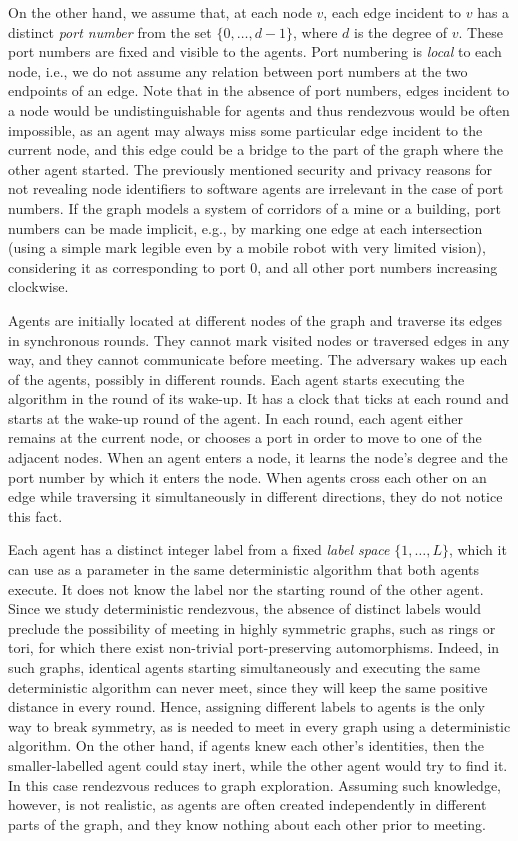 \documentclass{llncs}
\begin{document}
On the other hand, we assume that, at each node $v$,
each edge incident to $v$ has a distinct {\em port number} from the set 
$\{0,\dots,d-1\}$, where $d$ is the degree of $v$. These port numbers are fixed and visible to the agents.
Port numbering is {\em local} to each node, i.e., we do not assume any relation between
port numbers at  the two endpoints of an edge. Note that in the absence of port numbers, edges incident to a node
would be undistinguishable for agents and thus rendezvous would be often impossible, 
as an agent may always miss some particular edge incident to the current node, and this edge could be a bridge to the part of the graph
where the other agent started.
The previously mentioned security and privacy reasons for not revealing node identifiers to software agents are irrelevant in the case of port numbers. If
the graph models a system of corridors of a mine or a building, 
port numbers can be made implicit, e.g., by marking one edge at each intersection
(using a simple mark legible even by a mobile robot with very limited vision),
considering it as corresponding to port 0, and all other port numbers increasing clockwise.
 

Agents are initially located at different nodes of the graph and  traverse its edges in synchronous rounds.
They cannot mark visited nodes or traversed edges in any way, and they cannot communicate before meeting.
The adversary wakes up each of the agents, possibly in different rounds. 
Each agent starts executing the algorithm in the round of its wake-up.
It has a clock that ticks at each round and starts at the wake-up round of the agent.
In each round, each agent either remains at the current node,
or chooses a port in order to move to one of the adjacent nodes. 
When an agent enters a node, it learns the node's degree and the port  number by which it enters the node. When agents cross each other
on an edge while traversing it simultaneously in different directions, they do not notice this fact.

Each agent has a distinct integer label from a fixed {\em label space} $\{1,\dots,L\}$, which it can
use as a parameter in the same deterministic algorithm that both agents execute. It does not know the label nor the starting round of the other agent. 
Since we study deterministic rendezvous, the absence of distinct labels would preclude the possibility of meeting in highly
symmetric graphs, such as rings or tori, for which there exist non-trivial port-preserving automorphisms. Indeed, in such graphs,
identical agents starting simultaneously and executing the same deterministic algorithm can never meet, since they will keep the same positive distance in every round. 
Hence, assigning different labels to agents is the only way to break symmetry, as is needed to meet in every graph using a deterministic algorithm. 
On the other hand, if agents knew
each other's identities, then the smaller-labelled agent could stay inert, while the other agent would try to find it. In this case rendezvous reduces to graph exploration.   
Assuming such knowledge, however, is not realistic, as agents are often created independently in different parts of the graph, and they know nothing about each other
prior to meeting.
\end{document}
